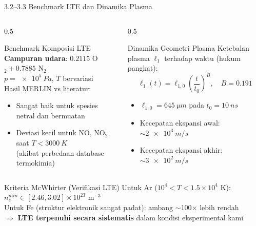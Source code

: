 \documentclass[aspectratio=169, 10pt]{beamer}
\begin{document}
\begin{frame}{3.2--3.3 Benchmark LTE dan Dinamika Plasma}
  \begin{columns}[T]
    \begin{column}{0.5\textwidth}
      \begin{block}{Benchmark Komposisi LTE}
        \small
        \textbf{Campuran udara}: $0.2115$ O$_2 + 0.7885$ N$_2$\\
        $p = \SI{e5}{Pa}$, $T$ bervariasi\\[4pt]
        Hasil MERLIN vs literatur:
        \begin{itemize}
          \item Sangat baik untuk spesies netral dan bermuatan
          \item Deviasi kecil untuk NO, NO$_2$ saat $T < \SI{3000}{K}$\\
                (akibat perbedaan database termokimia)
        \end{itemize}
      \end{block}
    \end{column}
    \begin{column}{0.5\textwidth}
      \begin{block}{Dinamika Geometri Plasma}
        \small
        Ketebalan plasma $\ell_1$ terhadap waktu (hukum pangkat):
        \begin{equation}
          \ell_1(t) = \ell_{1,0}\left(\frac{t}{t_0}\right)^B, \quad B = 0.191
        \end{equation}
        \begin{itemize}
          \item $\ell_{1,0} = \SI{645}{\micro m}$ pada $t_0 = \SI{10}{ns}$
          \item Kecepatan ekspansi awal: $\sim \SI{2e3}{m/s}$
          \item Kecepatan ekspansi akhir: $\sim \SI{3e2}{m/s}$
        \end{itemize}
      \end{block}
    \end{column}
  \end{columns}
  \vspace{6pt}
  \begin{alertblock}{Kriteria McWhirter (Verifikasi LTE)}
    \small
    Untuk Ar ($10^4 < T < 1.5\times10^4$ K): $n_e^{min} \in [2.46, 3.02]\times10^{23}$ m$^{-3}$\\
    Untuk Fe (struktur elektronik sangat padat): ambang $\sim$100$\times$ lebih rendah\\
    $\Rightarrow$ \textbf{LTE terpenuhi secara sistematis} dalam kondisi eksperimental kami
  \end{alertblock}
\end{frame}
\end{document}
